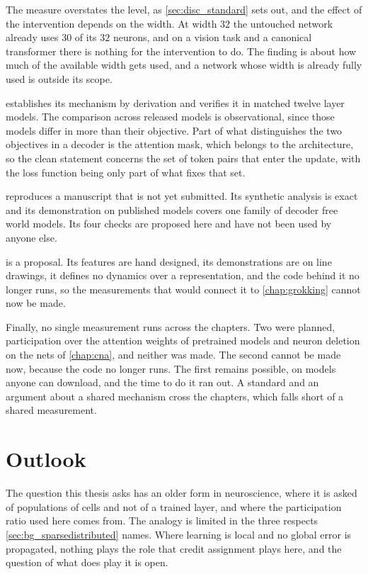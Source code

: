 The measure overstates the level, as \cref{sec:disc_standard} sets out, and
the effect of the intervention depends on the width. At width $32$ the
untouched network already uses $30$ of its $32$ neurons, and on a vision task
and a canonical transformer there is nothing for the intervention to do. The
finding is about how much of the available width gets used, and a network
whose width is already fully used is outside its scope.

 establishes its mechanism by derivation and verifies it
in matched twelve layer models. The comparison across released models is
observational, since those models differ in more than their objective. Part of
what distinguishes the two objectives in a decoder is the attention mask,
which belongs to the architecture, so the clean statement concerns the set of
token pairs that enter the update, with the loss function being only part of
what fixes that set.

 reproduces a manuscript that is not yet submitted. Its
synthetic analysis is exact and its demonstration on published models covers
one family of decoder free world models. Its four checks are proposed here and
have not been used by anyone else.

 is a proposal. Its features are hand designed, its
demonstrations are on line drawings, it defines no dynamics over a
representation, and the code behind it no longer runs, so the measurements
that would connect it to \cref{chap:grokking} cannot now be made.

Finally, no single measurement runs across the chapters. Two were planned, participation over the attention
weights of pretrained models and neuron deletion on the nets of
\cref{chap:cna}, and neither was made. The second cannot be made now, because
the code no longer runs. The first remains possible, on models anyone can download, and the time to do
it ran out. A standard
and an argument about a shared mechanism cross the chapters, which falls short
of a shared measurement.

\section{Outlook}
\label{sec:disc_outlook}

The question this thesis asks has an older form in neuroscience, where it is
asked of populations of cells and not of a trained layer, and where the
participation ratio used here comes from. The analogy is limited in the three
respects \cref{sec:bg_sparsedistributed} names. Where learning is local and no
global error is propagated, nothing plays the role that credit assignment
plays here, and the question of what does play it is open.

